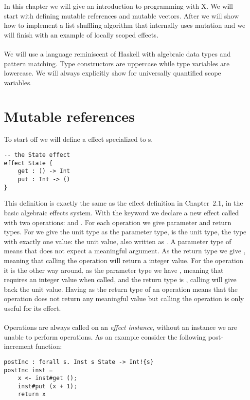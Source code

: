 \iffalse
\fi

In this chapter we will give an introduction to programming with X. We will start with defining mutable references and mutable vectors. After we will show how to implement a list shuffling algorithm that internally uses mutation and we will finish with an example of locally scoped effects.
\\\\
We will use a language reminiscent of Haskell with algebraic data types and pattern matching.
Type constructors are uppercase while type variables are lowercase.
We will always explicitly show  for universally quantified scope variables.

\section{Mutable references}
To start off we will define a  effect specialized to s.
\begin{verbatim}
-- the State effect
effect State {
	get : () -> Int
	put : Int -> ()
}
\end{verbatim}

This definition is exactly the same as the  effect definition in Chapter~2.1, in the basic algebraic effects system.
With the  keyword we declare a new effect called  with two operations:  and .
For each operation we give parameter and return types. For  we give the unit type \ident{()} as the parameter type, \ident{()} is the unit type, the type with exactly one value: the unit value, also written as \ident{()}. A parameter type of \ident{()} means that  does not expect a meaningful argument. As the return type we give , meaning that calling the  operation will return a integer value. For the  operation it is the other way around, as the parameter type we have , meaning that  requires an integer value when called, and the return type is \ident{()}, calling  will give back the unit value. Having \ident{()} as the return type of an operation means that the operation does not return any meaningful value but calling the operation is only useful for its effect.
\\\\
Operations are always called on an \emph{effect instance}, without an instance we are unable to perform operations.
As an example consider the following post-increment function:
\begin{verbatim}
postInc : forall s. Inst s State -> Int!{s}
postInc inst =
	x <- inst#get ();
	inst#put (x + 1);
	return x
\end{verbatim}

